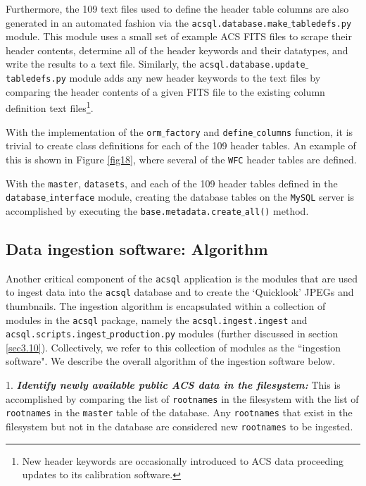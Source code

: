 \documentclass[10pt,journal,compsoc]{IEEEtran}
\begin{document}
Furthermore, the 109 text files used to define the header table columns are also generated in an automated fashion via the \texttt{acsql.database.make$\_$tabledefs.py} module.  This
module uses a small set of example ACS FITS files to scrape their header contents, determine all of the header keywords and their datatypes, and write the results to a text file.
Similarly, the \texttt{acsql.database.update$\_$tabledefs.py} module adds any new header keywords to the text files by comparing the header contents of a given FITS file to
the existing column definition text files\footnote{New header keywords are occasionally introduced to ACS data proceeding updates to its calibration software.}.

With the implementation of the \texttt{orm$\_$factory} and \texttt{define$\_$columns} function, it is trivial to create class definitions for each of the 109 header tables.  An
example of this is shown in Figure \ref{fig18}, where several of the \texttt{WFC} header tables are defined.

With the \texttt{master}, \texttt{datasets}, and each of the 109 header tables defined in the \texttt{database$\_$interface} module, creating the database tables on the \texttt{MySQL}
server is accomplished by executing the \texttt{base.metadata.create$\_$all()} method.


\subsection{Data ingestion software: Algorithm} \label{sec3.7}

Another critical component of the \texttt{acsql} application is the modules that are used to ingest data into the \texttt{acsql} database and to create the `Quicklook' JPEGs and
thumbnails. The ingestion algorithm is encapsulated within a collection of modules in the \texttt{acsql} package, namely the \texttt{acsql.ingest.ingest} and
\texttt{acsql.scripts.ingest$\_$production.py} modules (further discussed in section \ref{sec3.10}).  Collectively, we refer to this collection of modules as the ``ingestion software".
We describe the overall algorithm of the ingestion software below.

1. \textbf{\textit{Identify newly available public ACS data in the filesystem:}}  This is accomplished by comparing the list of \texttt{rootnames} in the filesystem with the list
of \texttt{rootnames} in the \texttt{master} table of the database.  Any \texttt{rootnames} that exist in the filesystem but not in the database are considered new \texttt{rootnames} to
be ingested.
\end{document}
